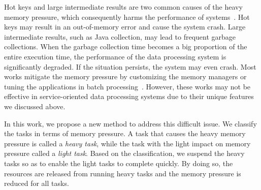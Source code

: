 Hot keys and large intermediate results are two common causes of the heavy memory pressure, which consequently harms the performance of  systems~\cite{fang2015interruptible}. Hot keys may result in an out-of-memory error and cause the system crash. Large intermediate results, such as Java collection, may lead to frequent garbage collections. When the garbage collection time becomes a big proportion of the entire execution time, the performance of the data processing system is significantly degraded. If the situation persists, the system may even crash. Most works mitigate the memory pressure by customizing the memory managers or tuning the applications in batch processing~\cite{www:spark-tuning, nguyen2015facade, fang2015interruptible, lulu:deca, nguyen:yak}. However, these works may not be effective in service-oriented data processing systems due to their unique features we discussed above. 

In this work, we propose a new method to address this difficult issue. We classify the tasks in terms of memory pressure. A task that causes the heavy memory pressure is called a \textit{heavy task}, while the task with the light impact on memory pressure called a \textit{light task}. Based on the classification, we suspend the heavy tasks so as to enable the light tasks to complete quickly. By doing so, the resources are released from running heavy tasks and the memory pressure is reduced for all tasks.


